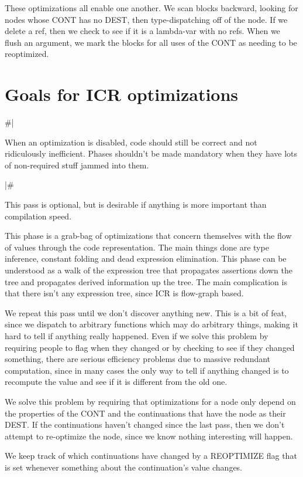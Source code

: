 These optimizations all enable one another.  We scan blocks backward, looking
for nodes whose CONT has no DEST, then type-dispatching off of the node.  If we
delete a ref, then we check to see if it is a lambda-var with no refs.  When we
flush an argument, we mark the blocks for all uses of the CONT as needing to be
reoptimized.


\section{Goals for ICR optimizations}

\#|

When an optimization is disabled, code should still be correct and not
ridiculously inefficient.  Phases shouldn't be made mandatory when they have
lots of non-required stuff jammed into them.

|\#

This pass is optional, but is desirable if anything is more important than
compilation speed.

This phase is a grab-bag of optimizations that concern themselves with the flow
of values through the code representation.  The main things done are type
inference, constant folding and dead expression elimination.  This phase can be
understood as a walk of the expression tree that propagates assertions down the
tree and propagates derived information up the tree.  The main complication is
that there isn't any expression tree, since ICR is flow-graph based.

We repeat this pass until we don't discover anything new.  This is a bit of
feat, since we dispatch to arbitrary functions which may do arbitrary things,
making it hard to tell if anything really happened.  Even if we solve this
problem by requiring people to flag when they changed or by checking to see if
they changed something, there are serious efficiency problems due to massive
redundant computation, since in many cases the only way to tell if anything
changed is to recompute the value and see if it is different from the old one.

We solve this problem by requiring that optimizations for a node only depend on
the properties of the CONT and the continuations that have the node as their
DEST.  If the continuations haven't changed since the last pass, then we don't
attempt to re-optimize the node, since we know nothing interesting will happen.

We keep track of which continuations have changed by a REOPTIMIZE flag that is
set whenever something about the continuation's value changes.

